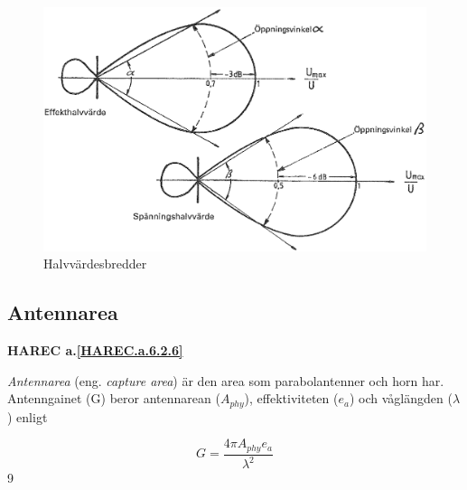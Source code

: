 \begin{figure}
  \includegraphics[width=\textwidth]{images/cropped_pdfs/bild_2_6-10.pdf}
  \caption{Halvvärdesbredder}
  \label{fig:bildII6-10}
\end{figure}

\subsection{Antennarea}
\textbf{
HAREC a.\ref{HAREC.a.6.2.6}\label{myHAREC.a.6.2.6}
}

\emph{Antennarea} (eng. \emph{capture area}) är den area som parabolantenner
och horn har. Antenngainet (G) beror antennarean (\(A_{phy}\)), effektiviteten
(\(e_a\)) och våglängden (\(\lambda\)) enligt

\[ G = \frac{4\pi A_{phy}e_a}{\lambda^2} \]
9

